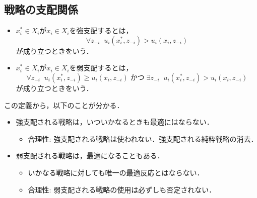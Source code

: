 \documentclass{jsreport}
\begin{document}
\subsection{戦略の支配関係}
\begin{screen}
  \begin{defi}
    \begin{itemize}
      \item $x_i^{*} \in X_i$が$x_i \in X_i$を強支配するとは，
      \begin{equation}
        \forall z_{-i} \; \; u_i(x_i^{*}, z_{-i}) > u_i(x_i, z_{-i}) \nonumber
      \end{equation}
      が成り立つときをいう．
      \item $x_i^{*} \in X_i$が$x_i \in X_i$を弱支配するとは，
      \begin{equation}
        \forall z_{-i} \; \; u_i(x_i^{*}, z_{-i}) \geq u_i(x_i, z_{-i}) \; かつ \; \exists z_{-i} \; \; u_i(x_i^{*}, z_{-i}) > u_i(x_i, z_{-i}) \nonumber
      \end{equation}
      が成り立つときをいう．
    \end{itemize}
  \end{defi}
\end{screen}

この定義から，以下のことが分かる．
\begin{itemize}
  \item 強支配される戦略は，いついかなるときも最適にはならない．
  \begin{itemize}
    \item 合理性: 強支配される戦略は使われない．強支配される純粋戦略の消去．
  \end{itemize}
  \item 弱支配される戦略は，最適になることもある．
  \begin{itemize}
    \item いかなる戦略に対しても唯一の最適反応とはならない．
    \item 合理性: 弱支配される戦略の使用は必ずしも否定されない．
  \end{itemize}
\end{itemize}
\end{document}
